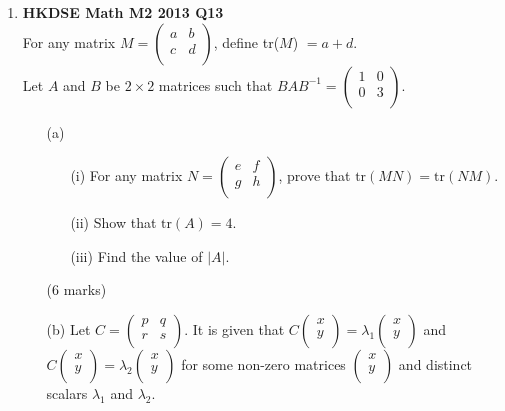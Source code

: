 \documentclass[12pt]{article}
\begin{document}
\begin{enumerate}
	\item \textbf{HKDSE Math M2 2013 Q13}\\
	For any matrix $M = \begin{pmatrix}
		a&b\\c&d\\
	\end{pmatrix}$, define tr($M$) $= a + d$.\\
	Let $A$ and $B$ be $2 \times 2$ matrices such that $BAB^{-1} = \begin{pmatrix}
		1&0\\0&3\\
	\end{pmatrix}$. 
	\begin{enumerate}
		\item [(a)]
		\begin{enumerate}
			\item [(i)]For any matrix $N = \begin{pmatrix}
				e&f\\g&h\\
			\end{pmatrix}$, prove that $\displaystyle\text{tr}(MN) = \text{tr}(NM)$. 
			\item [(ii)]Show that $\text{tr}(A) = 4$. 
			\item [(iii)]Find the value of $|A|$.
		\end{enumerate}
		(6 marks)
		\item [(b)]Let $C = \begin{pmatrix}
			p&q\\r&s\\
		\end{pmatrix}$. It is given that $C \begin{pmatrix} x\\y\\ \end{pmatrix} = \lambda_1\begin{pmatrix} x\\y\\ \end{pmatrix}$ and $C \begin{pmatrix} x\\y\\ \end{pmatrix} = \lambda_2\begin{pmatrix} x\\y\\ \end{pmatrix}$ for some non-zero matrices $\begin{pmatrix} x\\y\\ \end{pmatrix}$ and distinct scalars $\lambda_1$ and $\lambda_2$. 

\end{enumerate}
\end{enumerate}
\end{document}
